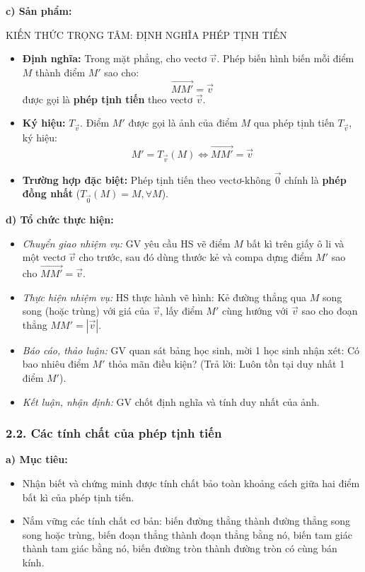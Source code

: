 \documentclass[12pt, a4paper]{article}
\renewcommand{\vec}[1]{\overrightarrow{#1}}
\begin{document}
\noindent \textbf{c) Sản phẩm:}  
  
\begin{pedabox}{KIẾN THỨC TRỌNG TÂM: ĐỊNH NGHĨA PHÉP TỊNH TIẾN}  
\begin{itemize}[leftmargin=0.6cm]  
    \item \textbf{Định nghĩa:} Trong mặt phẳng, cho vectơ $\vec{v}$. Phép biến hình biến mỗi điểm $M$ thành điểm $M'$ sao cho:  
    $$\vec{MM'} = \vec{v}$$  
    được gọi là \textbf{phép tịnh tiến} theo vectơ $\vec{v}$.  
    \item \textbf{Ký hiệu:} $T_{\vec{v}}$. Điểm $M'$ được gọi là ảnh của điểm $M$ qua phép tịnh tiến $T_{\vec{v}}$, ký hiệu:  
    $$M' = T_{\vec{v}}(M) \iff \vec{MM'} = \vec{v}$$  
    \item \textbf{Trường hợp đặc biệt:} Phép tịnh tiến theo vectơ-không $\vec{0}$ chính là \textbf{phép đồng nhất} ($T_{\vec{0}}(M) = M, \forall M$).  
\end{itemize}  
\end{pedabox}  
  
\noindent \textbf{d) Tổ chức thực hiện:}  
\begin{itemize}[leftmargin=0.8cm]  
    \item \textit{Chuyển giao nhiệm vụ:} GV yêu cầu HS vẽ điểm $M$ bất kì trên giấy ô li và một vectơ $\vec{v}$ cho trước, sau đó dùng thước kẻ và compa dựng điểm $M'$ sao cho $\vec{MM'} = \vec{v}$.  
    \item \textit{Thực hiện nhiệm vụ:} HS thực hành vẽ hình: Kẻ đường thẳng qua $M$ song song (hoặc trùng) với giá của $\vec{v}$, lấy điểm $M'$ cùng hướng với $\vec{v}$ sao cho đoạn thẳng $MM' = |\vec{v}|$.  
    \item \textit{Báo cáo, thảo luận:} GV quan sát bảng học sinh, mời 1 học sinh nhận xét: Có bao nhiêu điểm $M'$ thỏa mãn điều kiện? (Trả lời: Luôn tồn tại duy nhất 1 điểm $M'$).  
    \item \textit{Kết luận, nhận định:} GV chốt định nghĩa và tính duy nhất của ảnh.  
\end{itemize}  
  
\subsubsection*{2.2. Các tính chất của phép tịnh tiến}  
  
\noindent \textbf{a) Mục tiêu:}  
\begin{itemize}[leftmargin=0.8cm]  
    \item Nhận biết và chứng minh được tính chất bảo toàn khoảng cách giữa hai điểm bất kì của phép tịnh tiến.  
    \item Nắm vững các tính chất cơ bản: biến đường thẳng thành đường thẳng song song hoặc trùng, biến đoạn thẳng thành đoạn thẳng bằng nó, biến tam giác thành tam giác bằng nó, biến đường tròn thành đường tròn có cùng bán kính.  
\end{itemize}  
  
\end{document}
